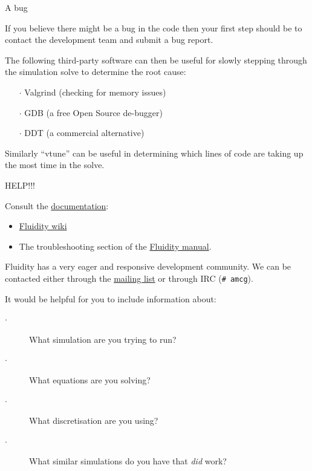 \documentclass[t]{beamer}
\begin{document}

\begin{frame}{A bug}

If you believe there might be a bug in the code
then your first step should be to contact the development team and submit a bug report.

\vspace{1ex}
The following third-party software can then be useful for slowly stepping through the simulation solve to determine the root cause:
\vspace{1ex}

\begin{itemize}
 \item[$\cdot$] Valgrind (checking for memory issues)
 \item[$\cdot$] GDB (a free Open Source de-bugger)
 \item[$\cdot$] DDT (a commercial alternative) 
\end{itemize}

Similarly ``vtune'' can be useful in determining which lines of code are taking up the most time in the solve.

\end{frame}


\begin{frame}{HELP!!!}

Consult the \href{https://fluidityproject.github.io/DocumentationSupport/index.html}{documentation}:
\begin{itemize}
 \item\href{https://github.com/FluidityProject/fluidity/wiki}{Fluidity wiki}
 \item The troubleshooting section of the \href{https://fluidityproject.github.io/DocumentationSupport/Manuals/index.html}{Fluidity manual}.
\end{itemize}

\vspace{1ex}
Fluidity has a very eager and responsive development community.  
We can be contacted either through the \href{mailman.ic.ac.uk/mailman/listinfo/fluidity}{mailing list}
or through IRC ({\tt \# amcg}).

\vspace{1ex}
It would be helpful for you to include information about:
\begin{description}
 \item[$\cdot$] What simulation are you trying to run?
 \item[$\cdot$] What equations are you solving?
 \item[$\cdot$] What discretisation are you using?
 \item[$\cdot$] What similar simulations do you have that {\it did} work?
 
\end{description}
\end{frame}
\end{document}
